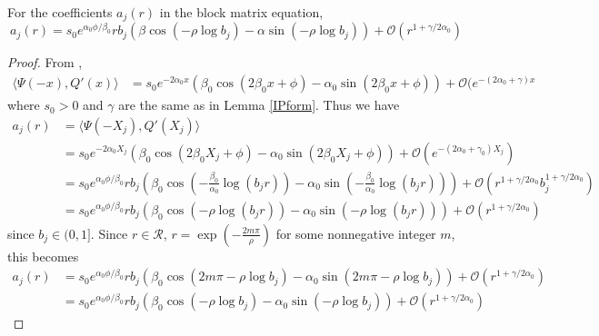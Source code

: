 \documentclass[thesis.tex]{subfiles}
\begin{document}
\begin{lemma}\label{lemma:ajparam}
For the coefficients $a_j(r)$ in the block matrix equation, 
\begin{equation}\label{ajparam}
a_j(r) = s_0 e^{\alpha_0 \phi/\beta_0} r b_j \left( \beta \cos\left(-\rho \log b_j \right) - \alpha \sin \left(-\rho \log b_j \right) \right) + \mathcal{O}(r^{1+\gamma/2\alpha_0})
\end{equation}

\begin{proof}
From \cite[Lemma 6.1]{Sandstede1998},
\begin{align*}\label{IPpsiQprime}
\langle \Psi(-x), Q'(x) \rangle
&= s_0 e^{-2 \alpha_0 x}\left( \beta_0 \cos(2 \beta_0 x + \phi) - \alpha_0 \sin(2 \beta_0 x + \phi)\right) + \mathcal{O}(e^{-(2 \alpha_0 + \gamma) x}
\end{align*}
where $s_0 > 0$ and $\gamma$ are the same as in Lemma \ref{IPform}. Thus we have
\begin{align*}
a_j(r) &= \langle \Psi(-X_j), Q'(X_j) \rangle \\
&= s_0 e^{-2 \alpha_0 X_j}\left( \beta_0 \cos(2 \beta_0 X_j + \phi) - \alpha_0 \sin(2 \beta_0 X_j + \phi)\right) + \mathcal{O}(e^{-(2 \alpha_0 + \gamma_0) X_j}) \\
&= s_0 e^{\alpha_0 \phi/\beta_0} r b_j \left( \beta_0 \cos\left( -\frac{\beta_0}{\alpha_0} \log(b_j r) \right) - \alpha_0 \sin \left( -\frac{\beta_0}{\alpha_0} \log(b_j r) \right) \right) + \mathcal{O}(r^{1+\gamma/2\alpha_0} b_j^{1 + \gamma/2\alpha_0}) \\
&= s_0 e^{\alpha_0 \phi/\beta_0} r b_j \left( \beta_0 \cos\left( -\rho \log(b_j r) \right) - \alpha_0 \sin \left( -\rho \log(b_j r) \right) \right) + \mathcal{O}(r^{1+\gamma/2\alpha_0})
\end{align*}
since $b_j \in (0, 1]$. Since $r \in \mathcal{R}$, $r = \exp\left(-\frac{2 m \pi}{\rho}\right)$ for some nonnegative integer $m$, this becomes 
\begin{align*}
a_j(r) &= s_0 e^{\alpha_0 \phi/\beta_0} r b_j \left( \beta_0 \cos\left( 2 m \pi -\rho \log b_j \right) - \alpha_0 \sin \left( 2 m \pi -\rho \log b_j \right) \right) + \mathcal{O}(r^{1+\gamma/2\alpha_0}) \\
&= s_0 e^{\alpha_0 \phi/\beta_0} r b_j \left( \beta_0 \cos\left(-\rho \log b_j \right) - \alpha_0 \sin \left(-\rho \log b_j \right) \right) + \mathcal{O}(r^{1+\gamma/2\alpha_0})
\end{align*}
\end{proof}
\end{lemma}
\end{document}
